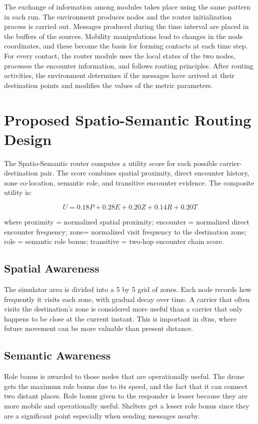 The exchange of information among modules takes place using the same pattern in each run. The environment produces nodes and the router initialization process is carried out. Messages produced during the time interval are placed in the buffers of the sources. Mobility manipulations lead to changes in the node coordinates, and these become the basis for forming contacts at each time step. For every contact, the router module uses the local states of the two nodes, processes the encounter information, and follows routing principles. After routing activities, the environment determines if the messages have arrived at their destination points and modifies the values of the metric parameters.

\section{Proposed Spatio-Semantic Routing Design}
The Spatio-Semantic router computes a utility score for each possible carrier-destination pair. The score combines spatial proximity, direct encounter history, zone co-location, semantic role, and transitive encounter evidence. The composite utility is:

\begin{equation}
	U = 0.18P + 0.28E + 0.20Z + 0.14R + 0.20T
\end{equation}

where \ac{proximity} = normalized spatial proximity; \ac{encounter} = normalized direct encounter frequency; \ac{zone}= normalized visit frequency to the destination zone;
\ac{role} = semantic role bonus; \ac{transitive}
= two-hop encounter chain score.

\subsection{Spatial Awareness}
The simulator area is divided into a 5 by 5 grid of zones. Each node records how
frequently it visits each zone, with gradual decay over time. A carrier that often visits
the destination’s zone is considered more useful than a carrier that only happens to be
close at the current instant. This is important in \acp{dtn}, where future movement can be
more valuable than present distance.

\subsection{Semantic Awareness}
Role bonus is awarded to those nodes that are operationally useful. The drone gets the maximum role bonus due to its speed, and the fact that it can connect two distant places. Role bonus given to the responder is lesser because they are more mobile and operationally useful. Shelters get a lesser role bonus since they are a significant point especially when sending messages nearby.


